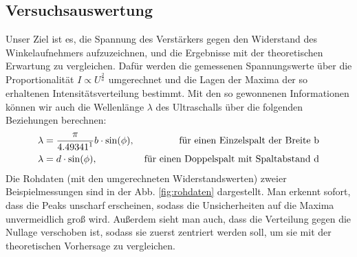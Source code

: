 \documentclass[12pt,a4paper]{article}
\begin{document}
\subsection{Versuchsauswertung}
Unser Ziel ist es, die Spannung des Verstärkers gegen den Widerstand des Winkelaufnehmers aufzuzeichnen, und die Ergebnisse mit der theoretischen Erwartung zu vergleichen. Dafür werden die gemessenen Spannungswerte über die Proportionalität $I\propto U^{\frac{2}{a}}$ umgerechnet und die Lagen der Maxima der so erhaltenen Intensitätsverteilung bestimmt. Mit den so gewonnenen Informationen können wir auch die Wellenlänge $\lambda$ des Ultraschalls über die folgenden Beziehungen berechnen:
\begin{align}
	\lambda &= \frac{\pi}{4.49341\footnotemark}b \cdot \sin(\phi),&\, \text{für einen Einzelspalt der Breite b}
	\label{eq:lambda2}\\
	\lambda &= d \cdot \sin(\phi),&\, \text{für einen Doppelspalt mit Spaltabstand d}
	\label{eq:lambda1}
\end{align}
Die Rohdaten (mit den umgerechneten Widerstandswerten) zweier Beispielmessungen sind in der Abb. \ref{fig:rohdaten} dargestellt. Man erkennt sofort, dass die Peaks unscharf erscheinen, sodass die Unsicherheiten auf die Maxima unvermeidlich groß wird. Außerdem sieht man auch, dass die Verteilung gegen die Nullage verschoben ist, sodass sie zuerst zentriert werden soll, um sie mit der theoretischen Vorhersage zu vergleichen.
\end{document}

